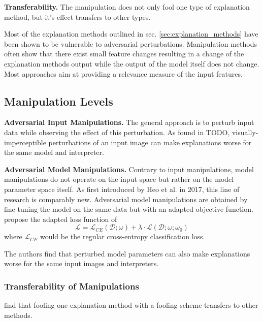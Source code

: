 \noindent\textbf{Transferability.} The manipulation does not only fool one type of explanation method, but it's effect transfers to other types. 



Most of the explanation methods outlined in sec. \autoref{sec:explanation_methods} have been shown to be vulnerable to adversarial perturbations. 
Manipulation methods often show that there exist small feature changes resulting in a change of the explanation methods output while the output of the model itself does not change. 
Most approaches aim at providing a relevance measure of the input features. \\



\subsection{Manipulation Levels}
\label{subsec:manipulation_levels}

\noindent\textbf{Adversarial Input Manipulations.} The general approach is to perturb input data while observing the effect of this perturbation. As found in TODO, visually-imperceptible perturbations of an input image can make explanations worse for the same model and interpreter. 


\noindent\textbf{Adversarial Model Manipulations.} 
Contrary to input manipulations, model manipulations do not operate on the input space but rather on the model parameter space itself. 
As first introduced by Heo et al. \cite{fooling_nn_interpreters} in 2017, this line of research is comparably new. 
Adversarial model manipulations are obtained by fine-tuning the model on the same data but with an adapted objective function. \cite{fooling_nn_interpreters} propose the adapted loss function of $$ \mathcal{L} = \mathcal{L}_{CE}(\mathcal{D};\omega) + \lambda \cdot \mathcal{L}(\mathcal{D};\omega; \omega_0) $$ where $\mathcal{L}_{CE}$ would be the regular cross-entropy classification loss. 

The authors find that perturbed model parameters can also make explanations worse for the same input images and interpreters. 



\subsubsection{Transferability of Manipulations}
\cite{fooling_nn_interpreters} find that fooling one explanation method with a fooling scheme transfers to other methods. 


